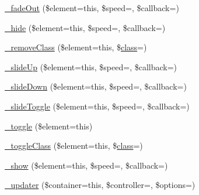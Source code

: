 \begin{DoxyCompactItemize}
\item 
\mbox{\hyperlink{class_c_i___jquery_a450b3e1f437001e56dcb15ad73ef4b93}{\+\_\+fade\+Out}} (\$element=\textquotesingle{}this\textquotesingle{}, \$speed=\textquotesingle{}\textquotesingle{}, \$callback=\textquotesingle{}\textquotesingle{})
\item 
\mbox{\hyperlink{class_c_i___jquery_a11a78a5297f13443708684ef7858a49c}{\+\_\+hide}} (\$element=\textquotesingle{}this\textquotesingle{}, \$speed=\textquotesingle{}\textquotesingle{}, \$callback=\textquotesingle{}\textquotesingle{})
\item 
\mbox{\hyperlink{class_c_i___jquery_af268174048a2d84ad3df004cec7b0a04}{\+\_\+remove\+Class}} (\$element=\textquotesingle{}this\textquotesingle{}, \$\mbox{\hyperlink{waiter_2olaporan_8php_a185c73c6507391d1eb38c776b68ce96d}{class}}=\textquotesingle{}\textquotesingle{})
\item 
\mbox{\hyperlink{class_c_i___jquery_a60ec32e453a0d1788fd444e35eca4de4}{\+\_\+slide\+Up}} (\$element=\textquotesingle{}this\textquotesingle{}, \$speed=\textquotesingle{}\textquotesingle{}, \$callback=\textquotesingle{}\textquotesingle{})
\item 
\mbox{\hyperlink{class_c_i___jquery_ac21f8bc7079c6a6e7faf04706a268728}{\+\_\+slide\+Down}} (\$element=\textquotesingle{}this\textquotesingle{}, \$speed=\textquotesingle{}\textquotesingle{}, \$callback=\textquotesingle{}\textquotesingle{})
\item 
\mbox{\hyperlink{class_c_i___jquery_aa00f8e284d752d889cb03e24d6313688}{\+\_\+slide\+Toggle}} (\$element=\textquotesingle{}this\textquotesingle{}, \$speed=\textquotesingle{}\textquotesingle{}, \$callback=\textquotesingle{}\textquotesingle{})
\item 
\mbox{\hyperlink{class_c_i___jquery_aa1c932f4aba1d5c8259da4dfd7e7a106}{\+\_\+toggle}} (\$element=\textquotesingle{}this\textquotesingle{})
\item 
\mbox{\hyperlink{class_c_i___jquery_afcfe440e86ec038bc62ac9be2296313b}{\+\_\+toggle\+Class}} (\$element=\textquotesingle{}this\textquotesingle{}, \$\mbox{\hyperlink{waiter_2olaporan_8php_a185c73c6507391d1eb38c776b68ce96d}{class}}=\textquotesingle{}\textquotesingle{})
\item 
\mbox{\hyperlink{class_c_i___jquery_afc1e291a9264809af8cbb0bb4a30dcb2}{\+\_\+show}} (\$element=\textquotesingle{}this\textquotesingle{}, \$speed=\textquotesingle{}\textquotesingle{}, \$callback=\textquotesingle{}\textquotesingle{})
\item 
\mbox{\hyperlink{class_c_i___jquery_ad9649192c4d81a3712aa0defc13c7ed3}{\+\_\+updater}} (\$container=\textquotesingle{}this\textquotesingle{}, \$controller=\textquotesingle{}\textquotesingle{}, \$options=\textquotesingle{}\textquotesingle{})

\end{DoxyCompactItemize}
